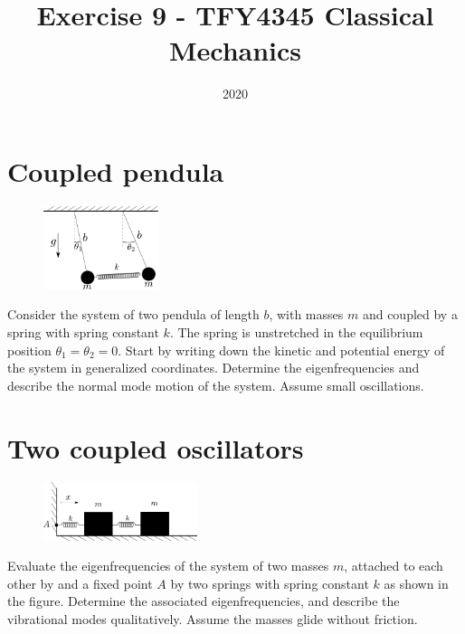 \documentclass{article}
\title{Exercise 9    - TFY4345 Classical Mechanics}
\date{2020}
\begin{document}
    \maketitle
    \section{Coupled pendula}
    \begin{figure}
        \includegraphics[width=0.3\textwidth]{figures/figure_1.pdf}
        \vspace*{-2.2cm}
    \end{figure}
    Consider the system of two pendula of length $b$, with masses $m$ and coupled by a spring with spring constant $k$. The spring is unstretched in the equilibrium position $\theta_1 = \theta_2 = 0$. Start by writing down the kinetic and potential energy of the system in generalized coordinates. Determine the eigenfrequencies and describe the normal mode motion of the system. Assume small oscillations.

    \section{Two coupled oscillators}
    \begin{figure}
        \includegraphics[width=0.4\textwidth]{figures/figure_2.pdf}
        \vspace*{-1cm}
    \end{figure}
    Evaluate the eigenfrequencies of the system of two masses $m$, attached to each other by and a fixed point $A$ by two springs with spring constant $k$ as shown in the figure. Determine the associated eigenfrequencies, and describe the vibrational modes qualitatively. Assume the masses glide without friction.
\end{document}
